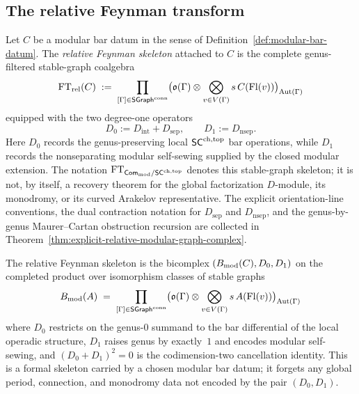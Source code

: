 \subsection{The relative Feynman transform}

\begin{definition}
\label{def:relative-feynman-transform}
Let $C$ be a modular bar datum in the sense of
Definition~\ref{def:modular-bar-datum}. The \emph{relative
Feynman skeleton} attached to $C$ is the complete
genus-filtered stable-graph coalgebra
\[
\mathrm{FT}_{\mathrm{rel}}(C)
\;:=\;
\prod_{[\Gamma] \in \mathsf{SGraph}^{\mathrm{conn}}}
\bigl(\mathfrak{o}(\Gamma) \otimes
\bigotimes_{v \in V(\Gamma)}
s\,C(\mathrm{Fl}(v))\bigr)_{\operatorname{Aut}(\Gamma)}
\]
equipped with the two degree-one operators
\[
D_0 := D_{\mathrm{int}} + D_{\mathrm{sep}},
\qquad
D_1 := D_{\mathrm{nsep}}.
\]
Here $D_0$ records the genus-preserving local
$\mathsf{SC}^{\mathrm{ch,top}}$ bar operations, while $D_1$ records the
nonseparating modular self-sewing supplied by the closed modular
extension. The notation
$\mathrm{FT}_{\mathsf{Com}_{\mathrm{mod}} / \mathsf{SC}^{\mathrm{ch,top}}}$ denotes this
stable-graph skeleton; it is not, by itself, a recovery theorem
for the global factorization $D$-module, its monodromy, or its
curved Arakelov representative.
The explicit orientation-line conventions, the dual contraction
notation for $D_{\mathrm{sep}}$ and $D_{\mathrm{nsep}}$, and the
genus-by-genus Maurer--Cartan obstruction recursion are collected in
Theorem~\ref{thm:explicit-relative-modular-graph-complex}.
\end{definition}

\begin{remark}
\label{rem:rft-self-contained}
The relative Feynman skeleton is the bicomplex
$(B_{\mathrm{mod}}(C),D_0,D_1)$ on the completed product over
isomorphism classes of stable graphs
\[
B_{\mathrm{mod}}(A) \;=\;
\prod_{[\Gamma] \in \mathsf{SGraph}^{\mathrm{conn}}}
\bigl(\mathfrak{o}(\Gamma) \otimes \bigotimes_{v \in V(\Gamma)}
s\,A(\mathrm{Fl}(v))\bigr)_{\operatorname{Aut}(\Gamma)}
\]
where $D_0$ restricts on the genus-$0$ summand to the bar
differential of the local operadic structure, $D_1$ raises
genus by exactly~$1$ and encodes modular self-sewing, and
$(D_0+D_1)^2=0$ is the codimension-two cancellation identity.
This is a formal skeleton carried by a chosen modular bar datum;
it forgets any global period, connection, and monodromy data not
encoded by the pair $(D_0,D_1)$.
\end{remark}

